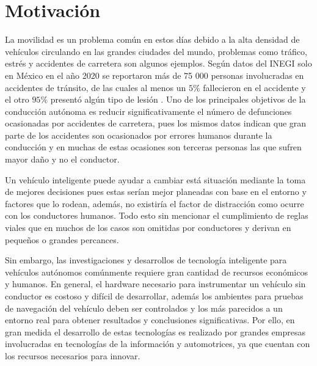 


\section{Motivación}

La movilidad es un problema común en estos días debido a la alta densidad de vehículos circulando en las grandes ciudades del mundo, problemas como tráfico, estrés y accidentes de carretera son algunos ejemplos. Según datos del INEGI solo en México en el año 2020 se reportaron más de 75 000 personas involucradas en accidentes de tránsito, de las cuales al menos un $5\%$ fallecieron en el accidente y el otro $95\%$ presentó algún tipo de lesión \cite{inegi}. Uno de los principales objetivos de la conducción autónoma es reducir significativamente el número de defunciones ocasionadas por accidentes de carretera, pues los mismos datos indican que gran parte de los accidentes son ocasionados por errores humanos durante la conducción y en muchas de estas ocasiones son terceras personas las que sufren mayor daño y no el conductor.

Un vehículo inteligente puede ayudar a cambiar está situación mediante la toma de mejores decisiones pues estas serían mejor planeadas con base en el entorno y factores que lo rodean, además, no existiría el factor de distracción como ocurre con los conductores humanos. Todo esto sin mencionar el cumplimiento de reglas viales que en muchos de los casos son omitidas por conductores y derivan en pequeños o grandes percances.

Sin embargo, las investigaciones y desarrollos de tecnología inteligente para vehículos autónomos comúnmente requiere gran cantidad de recursos económicos y humanos. En general, el hardware necesario para instrumentar un vehículo sin conductor es costoso y difícil de desarrollar, además los ambientes para pruebas de navegación del vehículo deben ser controlados y los más parecidos a un entorno real para obtener resultados y conclusiones significativas. Por ello, en gran medida el desarrollo de estas tecnologías es realizado por grandes empresas involucradas en tecnologías de la información y automotrices, ya que cuentan con los recursos necesarios para innovar.

